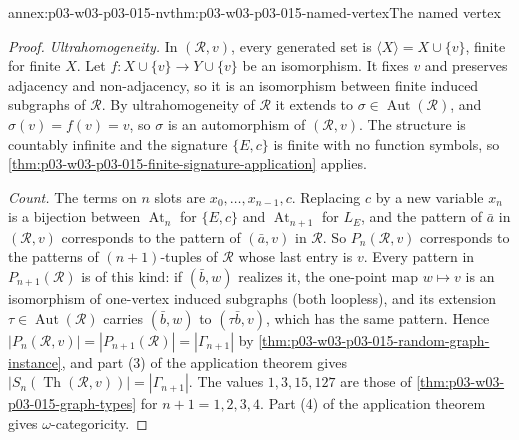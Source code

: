 \begin{annexitem}{annex:p03-w03-p03-015-nv}{thm:p03-w03-p03-015-named-vertex}{The named vertex}
\begin{proof}
\emph{Ultrahomogeneity.} In \((\mathcal R,v)\), every generated set is
\(\langle X\rangle=X\cup\{v\}\), finite for finite \(X\). Let
\(f:X\cup\{v\}\to Y\cup\{v\}\) be an isomorphism. It fixes \(v\) and
preserves adjacency and non-adjacency, so it is an isomorphism between
finite induced subgraphs of \(\mathcal R\). By ultrahomogeneity of
\(\mathcal R\) it extends to \(\sigma\in\operatorname{Aut}(\mathcal R)\),
and \(\sigma(v)=f(v)=v\), so \(\sigma\) is an automorphism of
\((\mathcal R,v)\). The structure is countably infinite and the signature
\(\{E,c\}\) is finite with no function symbols, so
\cref{thm:p03-w03-p03-015-finite-signature-application} applies.

\emph{Count.} The terms on \(n\) slots are \(x_0,\ldots,x_{n-1},c\).
Replacing \(c\) by a new variable \(x_n\) is a bijection between
\(\operatorname{At}_n\) for \(\{E,c\}\) and \(\operatorname{At}_{n+1}\)
for \(L_E\), and the pattern of \(\bar a\) in \((\mathcal R,v)\)
corresponds to the pattern of \((\bar a,v)\) in \(\mathcal R\). So
\(P_n(\mathcal R,v)\) corresponds to the patterns of \((n+1)\)-tuples of
\(\mathcal R\) whose last entry is \(v\). Every pattern in
\(P_{n+1}(\mathcal R)\) is of this kind: if \((\bar b,w)\) realizes it,
the one-point map \(w\mapsto v\) is an isomorphism of one-vertex induced
subgraphs (both loopless), and its extension
\(\tau\in\operatorname{Aut}(\mathcal R)\) carries \((\bar b,w)\) to
\((\tau\bar b,v)\), which has the same pattern. Hence
\(|P_n(\mathcal R,v)|=|P_{n+1}(\mathcal R)|=|\Gamma_{n+1}|\) by
\cref{thm:p03-w03-p03-015-random-graph-instance}, and part (3) of the
application theorem gives \(|S_n(\operatorname{Th}(\mathcal R,v))|=|\Gamma_{n+1}|\).
The values \(1,3,15,127\) are those of
\cref{thm:p03-w03-p03-015-graph-types} for \(n+1=1,2,3,4\).
Part (4) of the application theorem gives \(\omega\)-categoricity.
\end{proof}
\end{annexitem}

